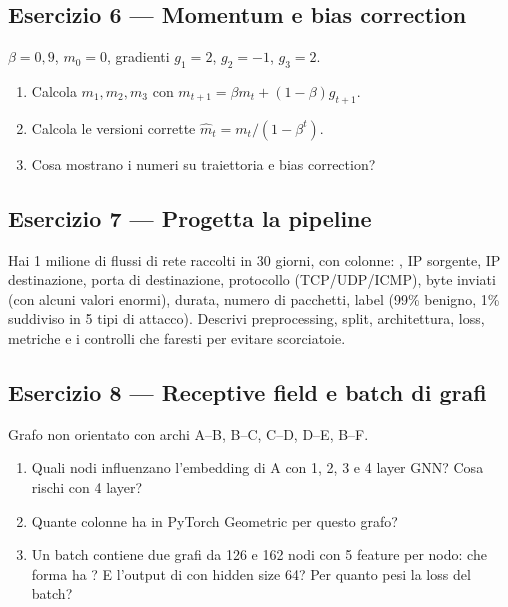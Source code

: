 \subsection*{Esercizio 6 --- Momentum e bias correction}\label{es:e6}
$\beta = 0{,}9$, $m_0 = 0$, gradienti $g_1 = 2$, $g_2 = -1$, $g_3 = 2$.
\begin{enumerate}[label=(\alph*)]
  \item Calcola $m_1, m_2, m_3$ con $m_{t+1} = \beta m_t + (1-\beta)g_{t+1}$.
  \item Calcola le versioni corrette $\hat m_t = m_t / (1-\beta^t)$.
  \item Cosa mostrano i numeri su traiettoria e bias correction?
\end{enumerate}

\subsection*{Esercizio 7 --- Progetta la pipeline}\label{es:e7}
Hai 1 milione di flussi di rete raccolti in 30 giorni, con colonne: , IP sorgente, IP destinazione, porta di
destinazione, protocollo (TCP/UDP/ICMP), byte inviati (con alcuni valori enormi), durata, numero di pacchetti, label (99\% benigno,
1\% suddiviso in 5 tipi di attacco). Descrivi preprocessing, split, architettura, loss, metriche e i controlli che faresti per
evitare scorciatoie.

\subsection*{Esercizio 8 --- Receptive field e batch di grafi}\label{es:e8}
Grafo non orientato con archi A--B, B--C, C--D, D--E, B--F.
\begin{enumerate}[label=(\alph*)]
  \item Quali nodi influenzano l'embedding di A con 1, 2, 3 e 4 layer GNN? Cosa rischi con 4 layer?
  \item Quante colonne ha  in PyTorch Geometric per questo grafo?
  \item Un batch contiene due grafi da 126 e 162 nodi con 5 feature per nodo: che forma ha ? E l'output di
         con hidden size 64? Per quanto pesi la loss del batch?
\end{enumerate}


